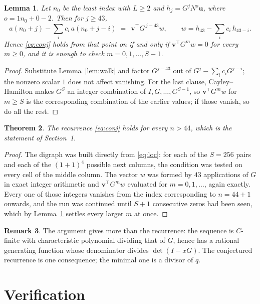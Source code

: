 \documentclass[11pt,a4paper]{article}
\theoremstyle{plain}
\newtheorem{theorem}{Theorem}
\newtheorem{lemma}[theorem]{Lemma}
\theoremstyle{definition}
\newtheorem{remark}[theorem]{Remark}
\begin{document}
\begin{lemma}\label{lem:crit}
Let $n_0$ be the least index with $L\ge2$ and $h_j=G^{j}N^{o}\mathbf{u}$, where
$o=1n_0+0-2$. Then for $j\ge43$,
\[
a(n_0+j)-\sum_i c_i\,a(n_0+j-i)\;=\;\,\mathbf{v}^{\!\top}G^{\,j-43}w,
\qquad w=h_{43}-\sum_i c_i\,h_{43-i} .
\]
Hence \eqref{eq:conj} holds from that point on if and only if
$\mathbf{v}^{\!\top}G^{m}w=0$ for every $m\ge0$, and it is enough to check
$m=0,1,\dots,S-1$.
\end{lemma}

\begin{proof}
Substitute Lemma~\ref{lem:walk} and factor $G^{j-43}$ out of
$G^{j}-\sum_ic_iG^{j-i}$; the nonzero scalar $1$ does not affect
vanishing. For the last clause, Cayley--Hamilton makes $G^{S}$ an integer combination of
$I,G,\dots,G^{S-1}$, so $\mathbf{v}^{\!\top}G^{m}w$ for $m\ge S$ is the corresponding
combination of the earlier values; if those vanish, so do all the rest.
\end{proof}

\begin{theorem}
The recurrence \eqref{eq:conj} holds for every $n>44$, which is the statement of
Section~1.
\end{theorem}

\begin{proof}
The digraph was built directly from \eqref{eq:loc}: for each of the $S=256$ pairs and each
of the $(1+1)^{4}$ possible next columns, the condition was tested on every cell of
the middle column. The vector $w$ was formed by $43$ applications of $G$ in exact integer
arithmetic and $\mathbf{v}^{\!\top}G^{m}w$ evaluated for $m=0,1,\dots$, again exactly.
Every one of those integers vanishes from the index corresponding to $n=44+1$ onwards,
and the run was continued until $S+1$ consecutive zeros had been seen, which by
Lemma~\ref{lem:crit} settles every larger $m$ at once.
\end{proof}

\begin{remark}
The argument gives more than the recurrence: the sequence is $C$-finite with characteristic
polynomial dividing that of $G$, hence has a rational generating function whose denominator
divides $\det(I-xG)$. The conjectured recurrence is one consequence; the minimal one is a
divisor of $q$.
\end{remark}

\section{Verification}
\end{document}
